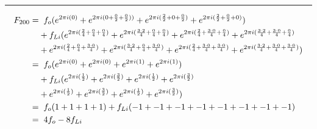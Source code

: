 \documentclass{article}
\begin{document}
\noindent\rule{12cm}{0.4pt}
\begin{align*}
	F_{200} =& \hspace{0.2cm}  f_{o}  (e^{2 \pi i (0)} 
	+ e^{2 \pi i (0 + \frac{0}{2} + \frac{0}{2}))} 
	+ e^{2 \pi i (\frac{2}{2} + 0 + \frac{0}{2})} 
	+ e^{2 \pi i (\frac{2}{2} + \frac{0}{2} + 0)})  \\
	&+ f_{Li} (e^{2 \pi i (\frac{2}{4} + \frac{0}{4} + \frac{0}{4})}  
	+ e^{2 \pi i (\frac{3 \cdot 2}{4} + \frac{0}{4} + \frac{0}{4})} 
	+ e^{2 \pi i (\frac{2}{4} + \frac{3 \cdot 0}{4} + \frac{0}{4})} 
	+ e^{2 \pi i (\frac{3 \cdot 2}{4} + \frac{3 \cdot 0}{4} + \frac{0}{4})} \\
	&+ e^{2 \pi i (\frac{2}{4} + \frac{0}{4} + \frac{3 \cdot 0}{4})}
	+ e^{2 \pi i (\frac{3 \cdot 2}{4} + \frac{0}{4} + \frac{3 \cdot 0}{4})} 
	+ e^{2 \pi i (\frac{2}{4} + \frac{3 \cdot 0}{4} + \frac{3 \cdot 0}{4})} 
	+ e^{2 \pi i (\frac{3 \cdot 2}{4} + \frac{3 \cdot 0}{4} + \frac{3 \cdot 0}{4})}) \\  
	=& \hspace{0.2cm}  f_{o}  (e^{2 \pi i (0)} 
	+ e^{2 \pi i (0)} 
	+ e^{2 \pi i (1)} 
	+ e^{2 \pi i (1)})  \\
	&+ f_{Li} (e^{2 \pi i (\frac{1}{2})}  
	+ e^{2 \pi i (\frac{3}{2})} 
	+ e^{2 \pi i (\frac{1}{2})} 
	+ e^{2 \pi i (\frac{3}{2})} \\
	&+ e^{2 \pi i (\frac{1}{2})}
	+ e^{2 \pi i (\frac{3}{2})} 
	+ e^{2 \pi i (\frac{1}{2})} 
	+ e^{2 \pi i (\frac{3}{2})}) \\
	=& \hspace{0.2cm}  f_{o}  (1  + 1 + 1 + 1) + f_{Li}(-1 + -1 + -1 + -1 + -1 + -1 + -1 + -1) \\
	=& \hspace{0.2cm} 4f_{o}   - 8f_{Li}
\end{align*}
\end{document}
